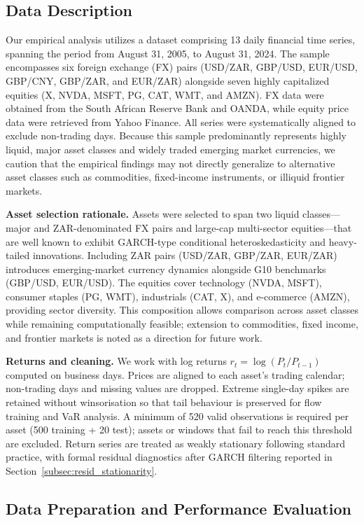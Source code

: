 \documentclass[risks,article,submit,pdftex,moreauthors]{Definitions/mdpi}
\begin{document}
\subsection{Data Description}
Our empirical analysis utilizes a dataset comprising 13 daily financial time series, spanning the period from August 31, 2005, to August 31, 2024. The sample encompasses six foreign exchange (FX) pairs (USD/ZAR, GBP/USD, EUR/USD, GBP/CNY, GBP/ZAR, and EUR/ZAR) alongside seven highly capitalized equities (X, NVDA, MSFT, PG, CAT, WMT, and AMZN). FX data were obtained from the South African Reserve Bank and OANDA, while equity price data were retrieved from Yahoo Finance. All series were systematically aligned to exclude non-trading days. Because this sample predominantly represents highly liquid, major asset classes and widely traded emerging market currencies, we caution that the empirical findings may not directly generalize to alternative asset classes such as commodities, fixed-income instruments, or illiquid frontier markets.

\textbf{Asset selection rationale.} Assets were selected to span two liquid classes—major and ZAR-denominated FX pairs and large-cap multi-sector equities—that are well known to exhibit GARCH-type conditional heteroskedasticity and heavy-tailed innovations. Including ZAR pairs (USD/ZAR, GBP/ZAR, EUR/ZAR) introduces emerging-market currency dynamics alongside G10 benchmarks (GBP/USD, EUR/USD). The equities cover technology (NVDA, MSFT), consumer staples (PG, WMT), industrials (CAT, X), and e-commerce (AMZN), providing sector diversity. This composition allows comparison across asset classes while remaining computationally feasible; extension to commodities, fixed income, and frontier markets is noted as a direction for future work.

\textbf{Returns and cleaning.} We work with log returns $r_t = \log(P_t / P_{t-1})$ computed on business days. Prices are aligned to each asset's trading calendar; non-trading days and missing values are dropped. Extreme single-day spikes are retained without winsorisation so that tail behaviour is preserved for flow training and VaR analysis. A minimum of 520 valid observations is required per asset (500 training + 20 test); assets or windows that fail to reach this threshold are excluded. Return series are treated as weakly stationary following standard practice, with formal residual diagnostics after GARCH filtering reported in Section~\ref{subsec:resid_stationarity}.

\subsection{Data Preparation and Performance Evaluation} 
\end{document}
